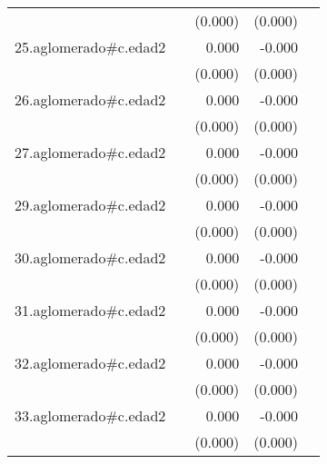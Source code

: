 {\begin{longtable}{l*{4}{D{.}{.}{-1}}}
            &                     &     (0.000)         &     (0.000)         &                     \\
\addlinespace
25.aglomerado#c.edad2&                     &       0.000         &      -0.000         &                     \\
            &                     &     (0.000)         &     (0.000)         &                     \\
\addlinespace
26.aglomerado#c.edad2&                     &       0.000         &      -0.000         &                     \\
            &                     &     (0.000)         &     (0.000)         &                     \\
\addlinespace
27.aglomerado#c.edad2&                     &       0.000         &      -0.000\sym{**} &                     \\
            &                     &     (0.000)         &     (0.000)         &                     \\
\addlinespace
29.aglomerado#c.edad2&                     &       0.000         &      -0.000\sym{*}  &                     \\
            &                     &     (0.000)         &     (0.000)         &                     \\
\addlinespace
30.aglomerado#c.edad2&                     &       0.000         &      -0.000\sym{***}&                     \\
            &                     &     (0.000)         &     (0.000)         &                     \\
\addlinespace
31.aglomerado#c.edad2&                     &       0.000\sym{*}  &      -0.000         &                     \\
            &                     &     (0.000)         &     (0.000)         &                     \\
\addlinespace
32.aglomerado#c.edad2&                     &       0.000         &      -0.000\sym{***}&                     \\
            &                     &     (0.000)         &     (0.000)         &                     \\
\addlinespace
33.aglomerado#c.edad2&                     &       0.000         &      -0.000\sym{***}&                     \\
            &                     &     (0.000)         &     (0.000)         &                     \\

\end{longtable}}
